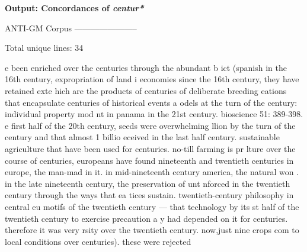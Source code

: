 \textbf{Output: Concordances of \textit{centur*}}
\begin{footnotesize}
ANTI-GM Corpus\newline
-----------------------

Total unique lines: 34

e been enriched over the centuries through the abundant b\newline
ict (spanish in the 16th century, expropriation of land i\newline
economies since the 16th century, they have retained exte\newline
hich are the products of centuries of deliberate breeding\newline
eations that encapsulate centuries of historical events a\newline
odels at the turn of the century: individual property mod\newline
nt in panama in the 21st century. bioscience 51: 389-398.\newline
e first half of the 20th century, seeds were overwhelming\newline
llion by the turn of the century and that almost 1 billio\newline
eceived in the last half century. sustainable agriculture\newline
 that have been used for centuries. no-till farming is pr\newline
lture over the course of centuries, europeans have found \newline
nineteenth and twentieth centuries in europe, the man-mad\newline
in it. in mid-nineteenth century america, the natural won\newline
. in the late nineteenth century, the preservation of unt\newline
nforced in the twentieth century through the ways that ea\newline
tices sustain. twentieth-century philosophy in central eu\newline
 motifs of the twentieth century — that technology by its\newline
st half of the twentieth century to exercise precaution a\newline
y had depended on it for centuries. therefore it was very\newline
rsity over the twentieth century. now,just nine crops com\newline
to local conditions over centuries). these were rejected \newline

\end{footnotesize}
